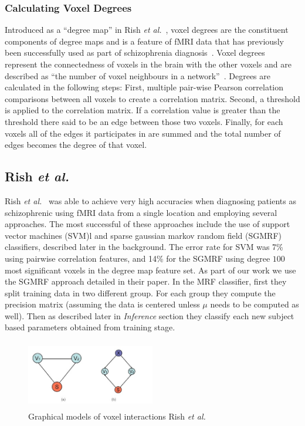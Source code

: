 \documentclass{article} %
\begin{document}
\subsubsection{Calculating Voxel Degrees}
Introduced as a ``degree map'' in Rish 
\emph{et al.}~\cite{rish2009discriminative}, voxel degrees are the constituent
components of degree maps and is a feature of fMRI data that has previously
been successfully used as part of schizophrenia diagnosis~\cite{Rish_2013}.
Voxel degrees represent the connectedness of voxels in the brain with the 
other voxels and are described as ``the number of voxel neighbours in a 
network''~\cite{Rish_2013}. Degrees are calculated in the following steps:
First, multiple pair-wise Pearson correlation comparisons between all voxels to 
create a correlation matrix. Second, a threshold is applied to the correlation
matrix. If a correlation value is greater than the threshold there said to be
an edge between those two voxels. Finally, for each voxels all of the edges
it participates in are summed and the total number of edges becomes the 
degree of that voxel.

\subsection{Rish \emph{et al.}}
Rish \emph{et al.}~\cite{Rish_2013} was able to achieve very high accuracies 
when diagnosing patients as schizophrenic using fMRI data from a 
single location and employing several approaches. The most successful of these
approaches include the use of support vector machines (SVM)l and sparse 
gaussian markov random field (SGMRF) classifiers, described later in the 
background. The error rate for SVM was 7\% using pairwise correlation features, 
and 14\% for the SGMRF using degree $100$ most significant voxels in the 
degree map feature set. As part of our work we use the SGMRF approach
detailed in their paper. In the MRF classifier, first they split training data 
in two different group. For each group they compute the precision matrix 
(assuming the data is centered unless $\mu$ needs to be computed as well). 
Then as described later in \textit{Inference} section they classify each new 
subject based parameters obtained from training stage.

\begin{figure}
  \begin{center}
  \includegraphics[width=0.5\textwidth, height=3.0cm]{diagrams/voxel.jpg}
  \caption{Graphical models of voxel interactions Rish \emph{et al.}}
  \label{voxel}
  \end{center}
\end{figure} 
\end{document}
